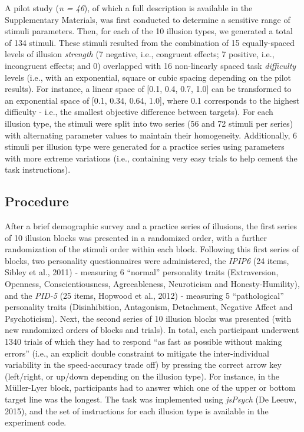 \documentclass[
  man,floatsintext]{apa6}
\begin{document}
A pilot study (\emph{n = 46}), of which a full description is available in the Supplementary Materials, was first conducted to determine a sensitive range of stimuli parameters. Then, for each of the 10 illusion types, we generated a total of 134 stimuli. These stimuli resulted from the combination of 15 equally-spaced levels of illusion \emph{strength} (7 negative, i.e., congruent effects; 7 positive, i.e., incongruent effects; and 0) overlapped with 16 non-linearly spaced task \emph{difficulty} levels (i.e., with an exponential, square or cubic spacing depending on the pilot results). For instance, a linear space of {[}0.1, 0.4, 0.7, 1.0{]} can be transformed to an exponential space of {[}0.1, 0.34, 0.64, 1.0{]}, where 0.1 corresponds to the highest difficulty - i.e., the smallest objective difference between targets). For each illusion type, the stimuli were split into two series (56 and 72 stimuli per series) with alternating parameter values to maintain their homogeneity. Additionally, 6 stimuli per illusion type were generated for a practice series using parameters with more extreme variations (i.e., containing very easy trials to help cement the task instructions).

\hypertarget{procedure}{%
\subsection{Procedure}\label{procedure}}

After a brief demographic survey and a practice series of illusions, the first series of 10 illusion blocks was presented in a randomized order, with a further randomization of the stimuli order within each block. Following this first series of blocks, two personality questionnaires were administered, the \emph{IPIP6} (24 items, Sibley et al., 2011) - measuring 6 ``normal'' personality traits (Extraversion, Openness, Conscientiousness, Agreeableness, Neuroticism and Honesty-Humility), and the \emph{PID-5} (25 items, Hopwood et al., 2012) - measuring 5 ``pathological'' personality traits (Disinhibition, Antagonism, Detachment, Negative Affect and Psychoticism). Next, the second series of 10 illusion blocks was presented (with new randomized orders of blocks and trials). In total, each participant underwent 1340 trials of which they had to respond ``as fast as possible without making errors'' (i.e., an explicit double constraint to mitigate the inter-individual variability in the speed-accuracy trade off) by pressing the correct arrow key (left/right, or up/down depending on the illusion type). For instance, in the Müller-Lyer block, participants had to answer which one of the upper or bottom target line was the longest. The task was implemented using \emph{jsPsych} (De Leeuw, 2015), and the set of instructions for each illusion type is available in the experiment code.
\end{document}
